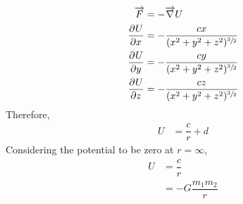 \documentclass[fleqn, a4paper, 12pt]{article}
\theoremstyle{definition}
\theoremstyle{theorem}
\begin{document}
\begin{align*}
	\overrightarrow{F} &= - \overrightarrow{\nabla} U\\
	\dpd{U}{x} &= - \dfrac{c x}{(x^2 + y^2 + z^2)^{\sfrac{3}{2}}}\\
	\dpd{U}{y} &= - \dfrac{c y}{(x^2 + y^2 + z^2)^{\sfrac{3}{2}}}\\
	\dpd{U}{z} &= - \dfrac{c z}{(x^2 + y^2 + z^2)^{\sfrac{3}{2}}}
\end{align*}
Therefore,
\begin{align*}
	U &= \dfrac{c}{r} + d
\end{align*}
Considering the potential to be zero at $r = \infty$,
\begin{align*}
	U &= \dfrac{c}{r}\\
	&= -G\dfrac{m_1 m_2}{r}
\end{align*}
\end{document}
